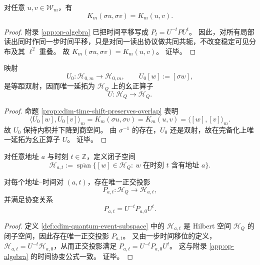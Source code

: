 \begin{proposition}[同步时间移位保持重叠核]\label{prop:cdim-time-shift-preserves-overlap}
对任意 \(u,v\in\mathcal W_m\)，有
\[
K_m(\sigma u,\sigma v)=K_m(u,v).
\]
\end{proposition}
\begin{proof}
附录 \ref{app:op-algebra} 已把时间平移写成
\(
P_t=U^{-t}PU^t
\)。
因此，对所有局部读出同时作同一步时间平移，只是对同一读出协议做共同共轭，不改变稳定可见分布及其 \(\ell^2\) 重叠。
故 \(K_m(\sigma u,\sigma v)=K_m(u,v)\)。
证毕。
\end{proof}

\begin{theorem}[离散幺正演化]\label{thm:cdim-discrete-unitary-evolution}
映射
\[
U_0:\mathcal H_{0,m}\longrightarrow \mathcal H_{0,m},
\qquad
U_0[w]:=[\sigma w],
\]
是等距双射，因而唯一延拓为 \(\mathcal H_Q\) 上的幺正算子
\[
U:\mathcal H_Q\to\mathcal H_Q.
\]
\end{theorem}
\begin{proof}
命题 \ref{prop:cdim-time-shift-preserves-overlap} 表明
\[
\langle U_0[w],U_0[v]\rangle_m
=
K_m(\sigma u,\sigma v)
=
K_m(u,v)
=
\langle [w],[v]\rangle_m.
\]
故 \(U_0\) 保持内积并下降到商空间。
由 \(\sigma^{-1}\) 的存在，\(U_0\) 还是双射，故在完备化上唯一延拓为幺正算子 \(U\)。
证毕。
\end{proof}

\begin{definition}[事件子空间]\label{def:cdim-quantum-event-subspace}
对任意地址 \(a\) 与时刻 \(t\in\mathbb Z\)，定义闭子空间
\[
\mathcal H_{a,t}
:=
\overline{\operatorname{span}}\{[w]\in\mathcal H_Q:\ w\text{ 在时刻 }t\text{ 含有地址 }a\}.
\]
\end{definition}

\begin{theorem}[量子事件]\label{thm:cdim-quantum-event-projections}
对每个地址--时间对 \((a,t)\)，存在唯一正交投影
\[
P_{a,t}:\mathcal H_Q\to\mathcal H_{a,t},
\]
并满足协变关系
\[
P_{a,t}=U^{-t}P_{a,0}U^t.
\]
\end{theorem}
\begin{proof}
定义 \ref{def:cdim-quantum-event-subspace} 中的 \(\mathcal H_{a,t}\) 是 Hilbert 空间 \(\mathcal H_Q\) 的闭子空间，因此存在唯一正交投影 \(P_{a,t}\)。
又由一步时间移位的定义，\(\mathcal H_{a,t}=U^{-t}\mathcal H_{a,0}\)，从而正交投影满足
\(
P_{a,t}=U^{-t}P_{a,0}U^t
\)。
这与附录 \ref{app:op-algebra} 的时间协变公式一致。
证毕。
\end{proof}

